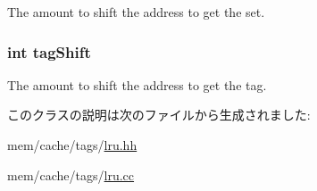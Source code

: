 \label{classLRU_a836015c10ab05e1e7c4be79579a50730}
The amount to shift the address to get the set. \hypertarget{classLRU_a782a405572109567b3a79ac934e91632}{
\subsubsection[{tagShift}]{\setlength{\rightskip}{0pt plus 5cm}int {\bf tagShift}}}
\label{classLRU_a782a405572109567b3a79ac934e91632}
The amount to shift the address to get the tag. 

このクラスの説明は次のファイルから生成されました:\begin{DoxyCompactItemize}
\item 
mem/cache/tags/\hyperlink{lru_8hh}{lru.hh}\item 
mem/cache/tags/\hyperlink{lru_8cc}{lru.cc}\end{DoxyCompactItemize}
